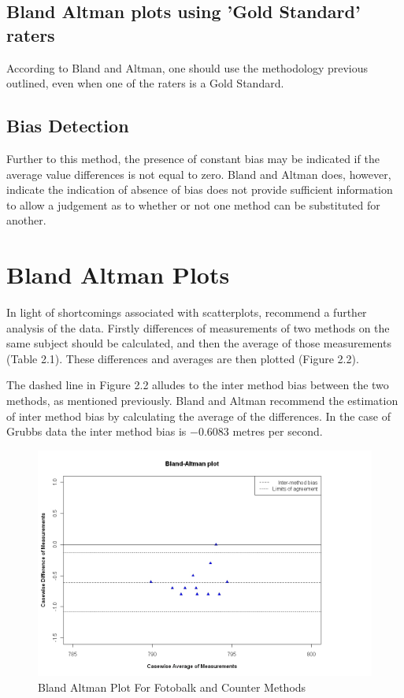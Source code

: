\documentclass[Main.tex]{subfiles}
\begin{document}
\subsection{Bland Altman plots using 'Gold Standard' raters}
According to Bland and Altman, one should use the methodology previous outlined, even when one of the raters is a Gold Standard.


\subsection{Bias Detection}
Further to this method, the presence of constant bias may be
indicated if the average value differences is not equal to zero. Bland and Altman does, however, indicate the indication of absence
of bias does not provide sufficient information to allow a judgement as to whether or not one method can be substituted for
another.

\section{Bland Altman Plots}



	
	In light of shortcomings associated with scatterplots,
	\citet*{BA83} recommend a further analysis of the data. Firstly
	differences of measurements of two methods on the same subject
	should  be calculated, and then the average of those measurements
	(Table 2.1). These differences and averages are then plotted
	(Figure 2.2).
	
	
	
	
	The dashed line in Figure 2.2 alludes to the inter method bias
	between the two methods, as mentioned previously. Bland and Altman
	recommend the estimation of inter method bias by calculating the
	average of the differences. In the case of Grubbs data the inter
	method bias is $-0.6083$ metres per second.

	\begin{figure}[h!]
		\begin{center}
			\includegraphics[width=120mm]{images/GrubbsBAplot.jpeg}
			\caption{Bland Altman Plot For Fotobalk and Counter Methods}\label{GrubbsBA}
		\end{center}
	\end{figure}
\end{document}
